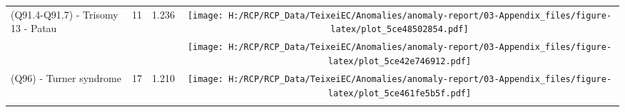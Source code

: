 \documentclass[
]{krantz}
\begin{document}
\begin{longtable}[t]{>{\raggedright\arraybackslash}m{4cm}cc>{}c}
(Q91.4-Q91.7) - Trisomy 13 - Patau & 11 & 1.236 & \texttt{[image: H:/RCP/RCP\_Data/TeixeiEC/Anomalies/anomaly-report/03-Appendix\_files/figure-latex/plot\_5ce48502854.pdf]}\\
\addlinespace
\cellcolor{gray!6}{(Q91.0-Q91.3) - Trisomy 18 - Edwards} & \cellcolor{gray!6}{24} & \cellcolor{gray!6}{1.230} & \cellcolor{gray!6}{}\texttt{[image: H:/RCP/RCP\_Data/TeixeiEC/Anomalies/anomaly-report/03-Appendix\_files/figure-latex/plot\_5ce42e746912.pdf]}\\
(Q96) - Turner syndrome & 17 & 1.210 & \texttt{[image: H:/RCP/RCP\_Data/TeixeiEC/Anomalies/anomaly-report/03-Appendix\_files/figure-latex/plot\_5ce461fe5b5f.pdf]}\\*
\end{longtable}
\endgroup{}
\end{document}
